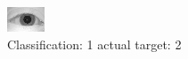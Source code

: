 \begin{figure}[h!]
\begin{center}
\includegraphics[width=0.60\columnwidth]{figures/ID914_class_1_target_2.png}
\end{center}
\caption{ Classification: 1 actual target: 2}
\label{fig:ID914_class_1_target_2}
\end{figure}
